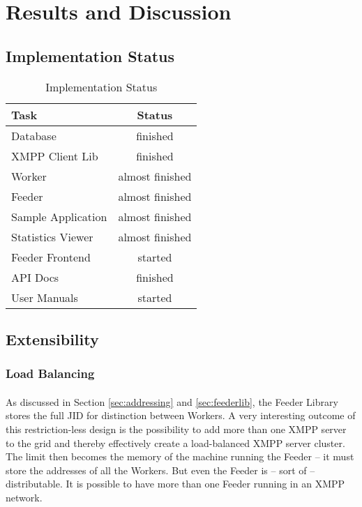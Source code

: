 \section{Results and Discussion}
\label{sec:discussion}

\subsection{Implementation Status}

\begin{table}[H]
\begin{tabularx}{\linewidth}{lc}
\toprule
\textbf{Task} & \textbf{Status} \\
\midrule
\endhead
Database           & finished \\
XMPP Client Lib    & finished \\
Worker             & almost finished \\
Feeder             & almost finished \\
Sample Application & almost finished \\
Statistics Viewer  & almost finished \\
Feeder Frontend    & started \\
API Docs           & finished \\
User Manuals       & started \\
\bottomrule
\end{tabularx}
\caption{Implementation Status}
\label{tab:impstatus}
\end{table}


\subsection{Extensibility}
\label{sec:extensibility}

\subsubsection{Load Balancing}
\paragraph{}
As discussed in Section \ref{sec:addressing} and \ref{sec:feederlib}, the Feeder Library stores the full JID for distinction between Workers. A very interesting outcome of this restriction-less design is the possibility to add more than one XMPP server to the grid and thereby effectively create a load-balanced XMPP server cluster. The limit then becomes the memory of the machine running the Feeder -- it must store the addresses of all the Workers. But even the Feeder is -- sort of -- distributable. It is possible to have more than one Feeder running in an XMPP network.


